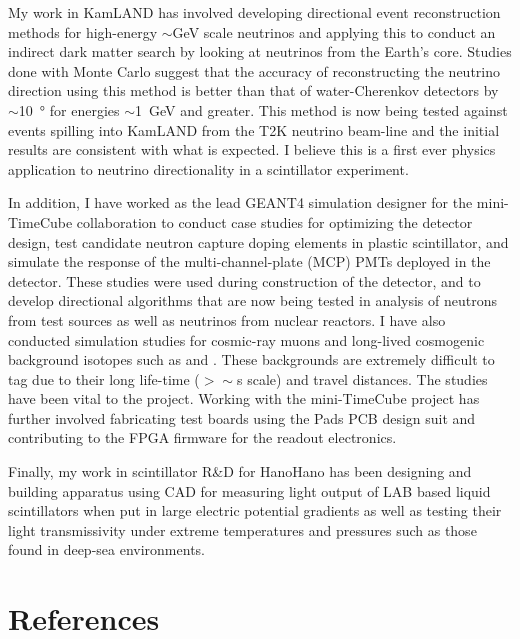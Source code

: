 \documentclass[a4paper,10pt]{article} %
\begin{document}
My work in KamLAND has involved developing directional event reconstruction
methods for high-energy $\sim$\si{\giga\electronvolt} scale neutrinos and
applying this to conduct an indirect dark matter search by looking at neutrinos
from the Earth's core.
Studies done with Monte Carlo suggest that the accuracy of reconstructing the
neutrino direction using this method is better than that of water-Cherenkov
detectors by $\sim$\SI{10}{\degree} for energies
$\sim$\SI{1}{\giga\electronvolt} and greater.
This method is now being tested against events spilling into KamLAND from the
T2K neutrino beam-line and the initial results are consistent with what is
expected.
I believe this is a first ever physics application to neutrino directionality in
a scintillator experiment.

In addition, I have worked as the lead GEANT4 simulation designer for the
mini-TimeCube collaboration to conduct case studies for optimizing the detector
design, test candidate neutron capture doping elements in plastic
scintillator, and simulate the response of the multi-channel-plate (MCP) PMTs
deployed in the detector.
These studies were used during construction of the detector, and to develop
directional algorithms that are now being tested in analysis of neutrons from
test sources as well as neutrinos from nuclear reactors.
I have also conducted simulation studies for cosmic-ray muons and long-lived
cosmogenic background isotopes such as  and .
These backgrounds are extremely difficult to tag due to their long life-time
($>\sim$\si{\second} scale) and travel distances.
The studies have been vital to the project.
Working with the mini-TimeCube project has further involved fabricating test
boards using the Pads PCB design suit and contributing to the FPGA firmware for
the readout electronics.

Finally, my work in scintillator R\&D for HanoHano has been designing and
building apparatus using CAD for measuring light output of LAB based liquid
scintillators when put in large electric potential gradients as well as
testing their light transmissivity under extreme temperatures and
pressures such as those found in deep-sea environments.


\section{References}
\end{document}
